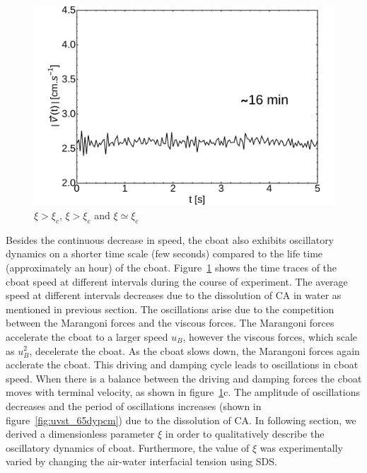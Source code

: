 \documentclass[journal=langd5, manuscript=article, layout=onecolumn]{achemso}
\begin{document}
\begin{figure}[ht]
\begin{minipage}[c]{0.3\linewidth}
		\includegraphics[width=\textwidth]{uvst_72dypcm_c.pdf}
	\end{minipage}
	\caption{$\xi > \xi_{c}$, $\xi > \xi_{c}$ and $\xi \simeq \xi_{c}$}\label{fig:uvst_72dypcm}
\end{figure}
Besides the continuous decrease in speed, the cboat also exhibits oscillatory dynamics on a shorter time scale (few seconds) compared to the life time (approximately an hour) of the cboat. Figure~\ref{fig:uvst_72dypcm} shows the time traces of the cboat speed at different intervals during the course of experiment. The average speed at different intervals decreases due to the dissolution of CA in water as mentioned in previous section. The oscillations arise due to the competition between the Marangoni forces and the viscous forces. The Marangoni forces accelerate the cboat to a larger speed $u_{B}$, however the viscous forces, which scale as $u_{B}^{2}$, decelerate the cboat. As the cboat slows down, the Marangoni forces again acclerate the cboat. This driving and damping cycle leads to oscillations in cboat speed. When there is a balance between the driving and damping forces the cboat moves with terminal velocity, as shown in figure~\ref{fig:uvst_72dypcm}c. The amplitude of oscillations decreases and the period of oscillations increases (shown in figure~\ref{fig:uvst_65dypcm}) due to the dissolution of CA. In following section, we derived a dimensionless parameter $\xi$ in order to qualitatively describe the oscillatory dynamics of cboat. Furthermore, the value of $\xi$ was experimentally varied by changing the air-water interfacial tension using SDS.
\end{document}
